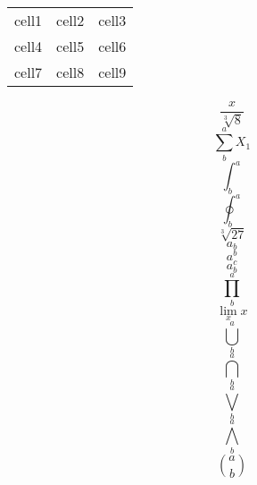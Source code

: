 \documentclass{article}
\begin{document}
\begin{center}
    \begin{tabular}{ c c c }
        cell1 & cell2 & cell3 \\
        cell4 & cell5 & cell6 \\
        cell7 & cell8 & cell9
    \end{tabular}
\end{center}
\begin{equation}             \frac{x}{\sqrt[3]{8}}             \end{equation}
\begin{equation}             \sum^{a}_{b}X_{1}             \end{equation}
\begin{equation}             \int^{a}_{b}             \end{equation}
\begin{equation}             \oint^{a}_{b}             \end{equation}
\begin{equation}                   \sqrt[3]{27}                   \end{equation}
\begin{equation}                  a_{b}                  \end{equation}
\begin{equation}                  a^{b}                  \end{equation}
\begin{equation}                  a^{c}_{b}                  \end{equation}
\begin{equation}                 \prod^{a}_{b}                 \end{equation}
\begin{equation}                 \lim_{x}x                 \end{equation}
\begin{equation}                \bigcup^{a}_{b}                \end{equation}
\begin{equation}                \bigcap^{a}_{b}                \end{equation}
\begin{equation}               \bigvee^{a}_{b}               \end{equation}
\begin{equation}               \bigwedge^{a}_{b}               \end{equation}
\begin{equation}              \binom{a}{b}              \end{equation}
\end{document}
